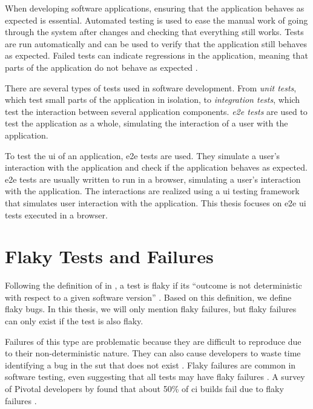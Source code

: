When developing software applications, ensuring that the application behaves as expected is essential.
Automated testing is used to ease the manual work of going through the system after changes and checking that everything still works.
Tests are run automatically and can be used to verify that the application still behaves as expected.
Failed tests can indicate regressions in the application, meaning that parts of the application do not behave as expected \autocite{lam_large-scale_2020, luo_empirical_2014,romano_empirical_2021}.

There are several types of tests used in software development.
From \emph{unit tests}, which test small parts of the application in isolation, to \emph{integration tests}, which test the interaction between several application components.
\emph{\ac{e2e} tests} are used to test the application as a whole, simulating the interaction of a user with the \autocite{jacob_schmitt_what_2022} application.

To test the \ac{ui} of an application, \ac{e2e} tests are used.
They simulate a user's interaction with the application and check if the application behaves as expected.
\ac{e2e} tests are usually written to run in a browser, simulating a user's interaction with the application.
The interactions are realized using a \ac{ui} testing framework that simulates user interaction with the application.
This thesis focuses on \ac{e2e} \ac{ui} tests executed in a browser.


\section{Flaky Tests and Failures}

Following the definition of \citeauthor*{luo_empirical_2014} in  \autocite{luo_empirical_2014}, a test is flaky if its \enquote{outcome is not deterministic with respect to a given software version} \autocite{luo_empirical_2014}.
Based on this definition, we define flaky bugs.
In this thesis, we will only mention flaky failures, but flaky failures can only exist if the test is also flaky.

Failures of this type are problematic because they are difficult to reproduce due to their non-deterministic nature.
They can also cause developers to waste time identifying a bug in the \ac{sut} that does not exist \autocite{ziftci_-flake_2020}.
Flaky failures are common in software testing, \citeauthor*{harman_start-ups_2018} even suggesting that all tests may have flaky failures \autocite{harman_start-ups_2018}.
A survey of Pivotal developers by \citeauthor*{hilton_trade-offs_2017} found that about 50\% of \ac{ci} builds fail due to flaky failures \autocite{hilton_trade-offs_2017}.

